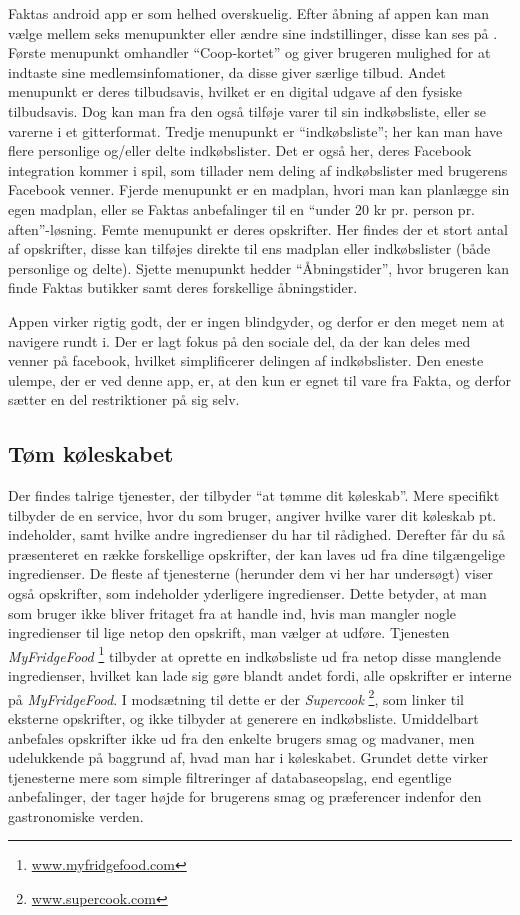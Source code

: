 Faktas android app er som helhed overskuelig.
Efter åbning af appen kan man vælge mellem seks menupunkter eller ændre sine indstillinger, disse kan ses på .
Første menupunkt omhandler ``Coop-kortet'' og giver brugeren mulighed for at indtaste sine medlemsinfomationer, da disse giver særlige tilbud.
Andet menupunkt er deres tilbudsavis, hvilket er en digital udgave af den fysiske tilbudsavis.
Dog kan man fra den også tilføje varer til sin indkøbsliste, eller se varerne i et gitterformat.
Tredje menupunkt er ``indkøbsliste''; her kan man have flere personlige og/eller delte indkøbslister.
Det er også her, deres Facebook integration kommer i spil, som tillader nem deling af indkøbslister med brugerens Facebook venner.
Fjerde menupunkt er en madplan, hvori man kan planlægge sin egen madplan, eller se Faktas anbefalinger til en ``under 20 kr pr. person pr. aften''-løsning.
Femte menupunkt er deres opskrifter.
Her findes der et stort antal af opskrifter, disse kan tilføjes direkte til ens madplan eller indkøbslister (både personlige og delte).
Sjette menupunkt hedder ``Åbningstider'', hvor brugeren kan finde Faktas butikker samt deres forskellige åbningstider.

Appen virker rigtig godt, der er ingen blindgyder, og derfor er den meget nem at navigere rundt i. 
Der er lagt fokus på den sociale del, da der kan deles med venner på facebook, hvilket simplificerer delingen af indkøbslister. 
Den eneste ulempe, der er ved denne app, er, at den kun er egnet til vare fra Fakta, og derfor sætter en del restriktioner på sig selv.

\subsection{Tøm køleskabet} 
Der findes talrige tjenester, der tilbyder ``at tømme dit køleskab''.
Mere specifikt tilbyder de en service, hvor du som bruger, angiver hvilke varer dit køleskab pt. indeholder, samt hvilke andre ingredienser du har til rådighed.
Derefter får du så præsenteret en række forskellige opskrifter, der kan laves ud fra dine tilgængelige ingredienser.
De fleste af tjenesterne (herunder dem vi her har undersøgt) viser også opskrifter, som indeholder yderligere ingredienser.
Dette betyder, at man som bruger ikke bliver fritaget fra at handle ind, hvis man mangler nogle ingredienser til lige netop den opskrift, man vælger at udføre.
Tjenesten \textit{MyFridgeFood} \footnote{\underline{www.myfridgefood.com}} tilbyder at oprette en indkøbsliste ud fra netop disse manglende ingredienser, hvilket kan lade sig gøre blandt andet fordi, alle opskrifter er interne på \textit{MyFridgeFood}.
I modsætning til dette er der \textit{Supercook} \footnote{\underline{www.supercook.com}}, som linker til eksterne opskrifter, og ikke tilbyder at generere en indkøbsliste.
Umiddelbart anbefales opskrifter ikke ud fra den enkelte brugers smag og madvaner, men udelukkende på baggrund af, hvad man har i køleskabet.
Grundet dette virker tjenesterne mere som simple filtreringer af databaseopslag, end egentlige anbefalinger, der tager højde for brugerens smag og præferencer indenfor den gastronomiske verden.

